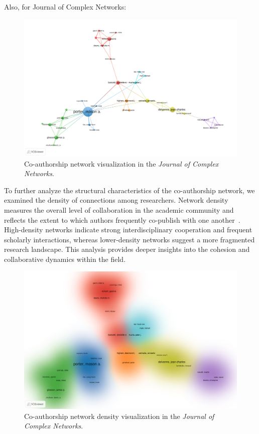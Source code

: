 \documentclass[twocolumn]{article}
\begin{document}
		Also, for Journal of Complex Networks: 
		
		\begin{figure}[htbp]
			\centering
			\includegraphics[width=\columnwidth]{Journal of Complex Networks/VOS/co-authorship.pdf}
			\caption{Co-authorship network visualization in the \textit{Journal of Complex Networks}.}
			\label{fig.fig12}
		\end{figure}
		
		To further analyze the structural characteristics of the co-authorship network, we examined the density of connections among researchers. Network density measures the overall level of collaboration in the academic community and reflects the extent to which authors frequently co-publish with one another~\cite{newman2001scientific, moody2004sociology, Barabasi2016}. High-density networks indicate strong interdisciplinary cooperation and frequent scholarly interactions, whereas lower-density networks suggest a more fragmented research landscape. This analysis provides deeper insights into the cohesion and collaborative dynamics within the field.
		
		
		\begin{figure}[htbp]
			\centering
			\includegraphics[width=\columnwidth]{Journal of Complex Networks/VOS/co-authorship-density.pdf}
			\caption{Co-authorship network density visualization in the \textit{Journal of Complex Networks}.}
			\label{fig.fig17}
		\end{figure}
		
\end{document}
